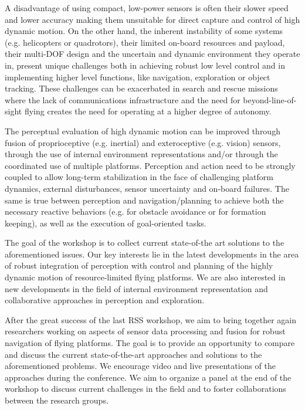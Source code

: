 \begin{spacing}{1.0}
{A disadvantage of using compact, low-power sensors is often their slower speed and lower accuracy making them unsuitable for direct capture and control of high dynamic motion. On the other hand, the inherent instability of some systems (e.g. helicopters or quadrotors), their limited on-board resources and payload, their multi-DOF design and the uncertain and dynamic environment they operate in, present unique challenges both in achieving robust low level control and in implementing higher level functions, like navigation, exploration or object tracking. These challenges can be exacerbated in search and rescue missions where the lack of communications infrastructure and the need for beyond-line-of-sight flying creates the need for operating at a higher degree of autonomy.

The perceptual evaluation of high dynamic motion can be improved through fusion of proprioceptive (e.g. inertial) and exteroceptive (e.g. vision) sensors, through the use of internal environment representations and/or through the coordinated use of multiple platforms. Perception and action need to be strongly coupled to allow long-term stabilization in the face of challenging platform dynamics, external disturbances, sensor uncertainty and on-board failures. The same is true between perception and navigation/planning to achieve both the necessary reactive behaviors (e.g. for obstacle avoidance or for formation keeping), as well as the execution of goal-oriented tasks.

The goal of the workshop is to collect current state-of-the art solutions to the aforementioned issues. Our key interests lie in the latest developments in the area of robust integration of perception with control and planning of the highly dynamic motion of resource-limited flying platforms. We are also interested in new developments in the field of internal environment representation and collaborative approaches in perception and exploration.

After the great success of the last RSS workshop, we aim to bring together again researchers working on aspects of sensor data processing and fusion for robust navigation of flying platforms. The goal is to provide an opportunity to compare and discuss the current state-of-the-art approaches and solutions to the aforementioned problems. We encourage video and live presentations of the approaches during the conference. We aim to organize a panel at the end of the workshop to discuss current challenges in the field and to foster collaborations between the research groups.
}




\end{spacing}
